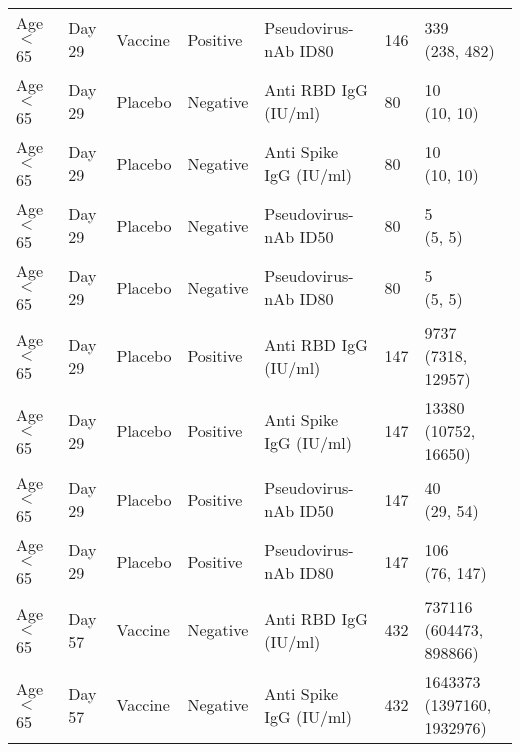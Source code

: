 \documentclass[]{book}
\theoremstyle{definition}
\theoremstyle{definition}
\theoremstyle{definition}
\newcommand{\1}{\mathbbm{1}}
\begin{document}
\begin{landscape}
\begin{ThreePartTable}
\begin{longtable}[t]{>{\raggedright\arraybackslash}p{7cm}llllll}
\hspace{1em}Age $<$ 65 & Day 29 & Vaccine & Positive & Pseudovirus-nAb ID80 & 146 & \makecell[l]{339\\(238, 482)}\\
\hspace{1em}Age $<$ 65 & Day 29 & Placebo & Negative & Anti RBD IgG (IU/ml) & 80 & \makecell[l]{10\\(10, 10)}\\
\hspace{1em}Age $<$ 65 & Day 29 & Placebo & Negative & Anti Spike IgG (IU/ml) & 80 & \makecell[l]{10\\(10, 10)}\\
\hspace{1em}Age $<$ 65 & Day 29 & Placebo & Negative & Pseudovirus-nAb ID50 & 80 & \makecell[l]{5\\(5, 5)}\\
\hspace{1em}Age $<$ 65 & Day 29 & Placebo & Negative & Pseudovirus-nAb ID80 & 80 & \makecell[l]{5\\(5, 5)}\\
\hspace{1em}Age $<$ 65 & Day 29 & Placebo & Positive & Anti RBD IgG (IU/ml) & 147 & \makecell[l]{9737\\(7318, 12957)}\\
\hspace{1em}Age $<$ 65 & Day 29 & Placebo & Positive & Anti Spike IgG (IU/ml) & 147 & \makecell[l]{13380\\(10752, 16650)}\\
\hspace{1em}Age $<$ 65 & Day 29 & Placebo & Positive & Pseudovirus-nAb ID50 & 147 & \makecell[l]{40\\(29, 54)}\\
\hspace{1em}Age $<$ 65 & Day 29 & Placebo & Positive & Pseudovirus-nAb ID80 & 147 & \makecell[l]{106\\(76, 147)}\\
\hspace{1em}Age $<$ 65 & Day 57 & Vaccine & Negative & Anti RBD IgG (IU/ml) & 432 & \makecell[l]{737116\\(604473, 898866)}\\
\hspace{1em}Age $<$ 65 & Day 57 & Vaccine & Negative & Anti Spike IgG (IU/ml) & 432 & \makecell[l]{1643373\\(1397160, 1932976)}\\

\end{longtable}
\end{ThreePartTable}
\end{landscape}
\end{document}
